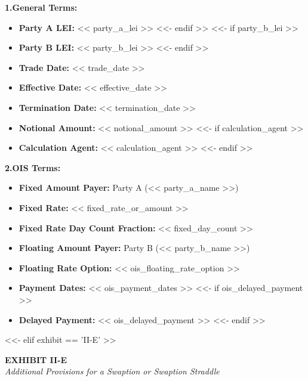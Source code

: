 \documentclass[11pt, a4paper]{article}
\begin{document}
\vspace{0.3cm}
\noindent \textbf{1.\quad General Terms:}
\begin{itemize}[leftmargin=2cm, label={}, itemsep=3pt]
<<- if party_a_lei >>
    \item \textbf{Party A LEI:} << party_a_lei >>
<<- endif >>
<<- if party_b_lei >>
    \item \textbf{Party B LEI:} << party_b_lei >>
<<- endif >>
    \item \textbf{Trade Date:} << trade_date >>
    \item \textbf{Effective Date:} << effective_date >>
    \item \textbf{Termination Date:} << termination_date >>
    \item \textbf{Notional Amount:} << notional_amount >>
<<- if calculation_agent >>
    \item \textbf{Calculation Agent:} << calculation_agent >>
<<- endif >>
\end{itemize}

\vspace{0.3cm}
\noindent \textbf{2.\quad OIS Terms:}
\begin{itemize}[leftmargin=2cm, label={}, itemsep=3pt]
    \item \textbf{Fixed Amount Payer:} Party A (<< party_a_name >>)
    \item \textbf{Fixed Rate:} << fixed_rate_or_amount >>
    \item \textbf{Fixed Rate Day Count Fraction:} << fixed_day_count >>
    \item \textbf{Floating Amount Payer:} Party B (<< party_b_name >>)
    \item \textbf{Floating Rate Option:} << ois_floating_rate_option >>
    \item \textbf{Payment Dates:} << ois_payment_dates >>
<<- if ois_delayed_payment >>
    \item \textbf{Delayed Payment:} << ois_delayed_payment >>
<<- endif >>
\end{itemize}

<<- elif exhibit == 'II-E' >>
\begin{center}
    \textbf{EXHIBIT II-E} \\
    \textit{Additional Provisions for a Swaption or Swaption Straddle}
\end{center}
\end{document}

